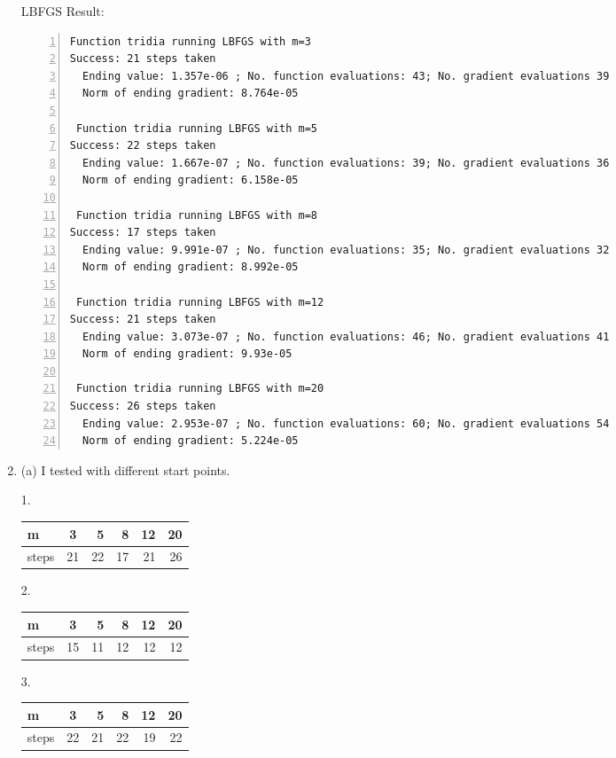 \documentclass[12pt]{article}
\begin{document}
\begin{enumerate}
LBFGS Result:

\begin{lstlisting}[language={[ANSI]C}, numbers=left, numberstyle=\tiny, frame=shadowbox, basicstyle=\ttfamily\small, showspaces=false, breaklines=true, showstringspaces=false, showtabs=false]
 Function tridia running LBFGS with m=3
Success: 21 steps taken
  Ending value: 1.357e-06 ; No. function evaluations: 43; No. gradient evaluations 39
  Norm of ending gradient: 8.764e-05

 Function tridia running LBFGS with m=5
Success: 22 steps taken
  Ending value: 1.667e-07 ; No. function evaluations: 39; No. gradient evaluations 36
  Norm of ending gradient: 6.158e-05

 Function tridia running LBFGS with m=8
Success: 17 steps taken
  Ending value: 9.991e-07 ; No. function evaluations: 35; No. gradient evaluations 32
  Norm of ending gradient: 8.992e-05

 Function tridia running LBFGS with m=12
Success: 21 steps taken
  Ending value: 3.073e-07 ; No. function evaluations: 46; No. gradient evaluations 41
  Norm of ending gradient: 9.93e-05

 Function tridia running LBFGS with m=20
Success: 26 steps taken
  Ending value: 2.953e-07 ; No. function evaluations: 60; No. gradient evaluations 54
  Norm of ending gradient: 5.224e-05
\end{lstlisting}

\bigskip

\bigskip

\bigskip


\item

(a) I tested with different start points.

1.

\begin{tabular}{|l|c|r|r|r|r|}
m & 3 & 5 & 8 & 12 & 20\\
\hline
steps & 21 & 22 & 17 & 21 & 26\\
\end{tabular}

2.

\begin{tabular}{|l|c|r|r|r|r|}
m & 3 & 5 & 8 & 12 & 20\\
\hline
steps & 15 & 11 & 12 & 12 & 12\\
\end{tabular}

3.

\begin{tabular}{|l|c|r|r|r|r|}
m & 3 & 5 & 8 & 12 & 20\\
\hline
steps & 22 & 21 & 22 & 19 & 22\\
\end{tabular}


\end{enumerate}
\end{document}
